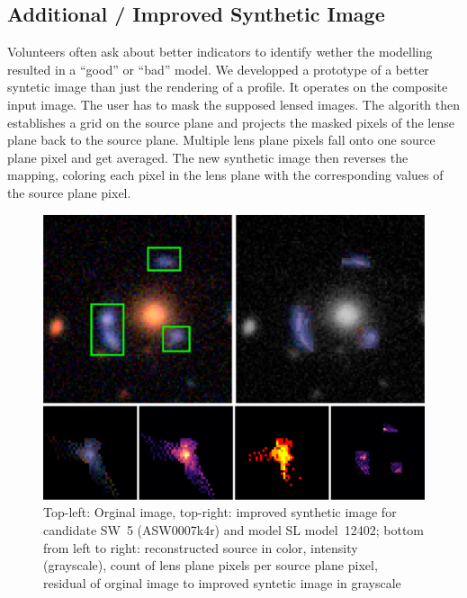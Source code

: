 \documentclass[fleqn,usenatbib]{mnras}
\newcommand{\asw}[1]{ASW000#1}
\newcommand{\sw}[1]{SW~#1}
\newcommand{\model}[1]{SL model~#1}
\begin{document}
\subsection{Additional / Improved Synthetic Image}

Volunteers often ask about better indicators to identify wether the modelling resulted in a ``good'' or ``bad'' model.
We developped a prototype of a better syntetic image than just the rendering of a  profile.
It operates on the composite input image.
The user has to mask the supposed lensed images.
The algorith then establishes a grid on the source plane and projects the masked pixels of the lense plane back to the source plane.
Multiple lens plane pixels fall onto one source plane pixel and get averaged.
The new synthetic image then reverses the mapping, coloring each pixel in the lens plane with the corresponding values of the source plane pixel.

\begin{figure}
  \includegraphics[width=\linewidth]{img/new_synth_img_detailed}
  \caption{
      Top-left: Orginal image, top-right: improved synthetic image for candidate \sw{5} (\asw{7k4r}) and model \model{12402};
      bottom from left to right:
        reconstructed source in color,
        intensity (grayscale),
        count of lens plane pixels per source plane pixel,
        residual of orginal image to improved syntetic image in grayscale
    }
  \label{fig:synthimg}
\end{figure}
\end{document}
